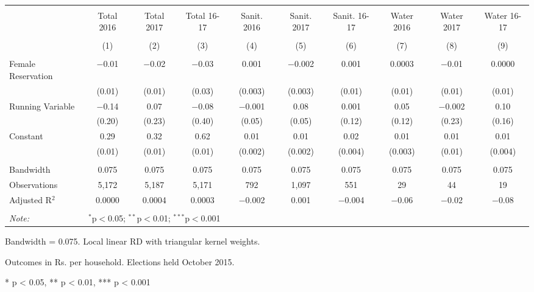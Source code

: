 \begin{table}
\centering
\begin{threeparttable}

  \caption{} 
  \label{} 
\scriptsize 
\begin{tabular}{@{\extracolsep{0pt}}lccccccccc} 
\\[-1.8ex]\hline 
\hline \\[-1.8ex] 
 & Total 2016 & Total 2017 & Total 16-17 & Sanit. 2016 & Sanit. 2017 & Sanit. 16-17 & Water 2016 & Water 2017 & Water 16-17 \\ 
\\[-1.8ex] & (1) & (2) & (3) & (4) & (5) & (6) & (7) & (8) & (9)\\ 
\hline \\[-1.8ex] 
 Female Reservation & $-$0.01 & $-$0.02 & $-$0.03 & 0.001 & $-$0.002 & 0.001 & 0.0003 & $-$0.01 & 0.0000 \\ 
  & (0.01) & (0.01) & (0.03) & (0.003) & (0.003) & (0.01) & (0.01) & (0.01) & (0.01) \\ 
  Running Variable & $-$0.14 & 0.07 & $-$0.08 & $-$0.001 & 0.08 & 0.001 & 0.05 & $-$0.002 & 0.10 \\ 
  & (0.20) & (0.23) & (0.40) & (0.05) & (0.05) & (0.12) & (0.12) & (0.23) & (0.16) \\ 
  Constant & 0.29 & 0.32 & 0.62 & 0.01 & 0.01 & 0.02 & 0.01 & 0.01 & 0.01 \\ 
  & (0.01) & (0.01) & (0.01) & (0.002) & (0.002) & (0.004) & (0.003) & (0.01) & (0.004) \\ 
 \hline \\[-1.8ex] 
Bandwidth & 0.075 & 0.075 & 0.075 & 0.075 & 0.075 & 0.075 & 0.075 & 0.075 & 0.075 \\ 
Observations & 5,172 & 5,187 & 5,171 & 792 & 1,097 & 551 & 29 & 44 & 19 \\ 
Adjusted R$^{2}$ & 0.0000 & 0.0004 & 0.0003 & $-$0.002 & 0.001 & $-$0.004 & $-$0.06 & $-$0.02 & $-$0.08 \\ 
\hline 
\hline \\[-1.8ex] 
\textit{Note:}  & \multicolumn{9}{l}{$^{*}$p$<$0.05; $^{**}$p$<$0.01; $^{***}$p$<$0.001} \\ 
\end{tabular} 
\begin{tablenotes}[flushleft]
\setlength{\itemindent}{0em}
\scriptsize
\item[] Bandwidth = 0.075. Local linear RD with triangular kernel weights.
\item[] Outcomes in Rs. per household. Elections held October 2015.
\item[] * p < 0.05, ** p < 0.01, *** p < 0.001
\end{tablenotes}
\end{threeparttable}
\end{table}

